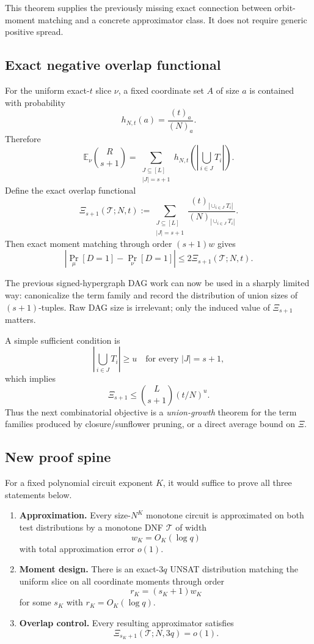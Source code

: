 \documentclass[11pt]{article}
\begin{document}
This theorem supplies the previously missing exact connection between orbit-moment matching and a concrete approximator class. It does not require generic positive spread.

\subsection{Exact negative overlap functional}
For the uniform exact-$t$ slice $\nu$, a fixed coordinate set $A$ of size $a$ is contained with probability
\[
h_{N,t}(a)=\frac{(t)_a}{(N)_a}.
\]
Therefore
\[
\mathbb E_\nu\binom R{s+1}
=
\sum_{\substack{J\subseteq[L]\\|J|=s+1}}
h_{N,t}\!\left(\left|\bigcup_{i\in J}T_i\right|\right).
\]
Define the exact overlap functional
\[
\Xi_{s+1}(\mathcal T;N,t)
:=
\sum_{\substack{J\subseteq[L]\\|J|=s+1}}
\frac{(t)_{|\cup_{i\in J}T_i|}}{(N)_{|\cup_{i\in J}T_i|}}.
\]
Then exact moment matching through order $(s+1)w$ gives
\[
\boxed{
\left|\Pr_\mu[D=1]-\Pr_\nu[D=1]\right|
\le 2\Xi_{s+1}(\mathcal T;N,t).
}
\]

The previous signed-hypergraph DAG work can now be used in a sharply limited way: canonicalize the term family and record the distribution of union sizes of $(s+1)$-tuples. Raw DAG size is irrelevant; only the induced value of $\Xi_{s+1}$ matters.

A simple sufficient condition is
\[
\left|\bigcup_{i\in J}T_i\right|\ge u
\quad\text{for every }|J|=s+1,
\]
which implies
\[
\Xi_{s+1}\le \binom L{s+1}(t/N)^u.
\]
Thus the next combinatorial objective is a \emph{union-growth} theorem for the term families produced by closure/sunflower pruning, or a direct average bound on $\Xi$.

\subsection{New proof spine}
For a fixed polynomial circuit exponent $K$, it would suffice to prove all three statements below.

\begin{enumerate}
\item \textbf{Approximation.} Every size-$N^K$ monotone circuit is approximated on both test distributions by a monotone DNF $\mathcal T$ of width
\[
w_K=O_K(\log q)
\]
with total approximation error $o(1)$.
\item \textbf{Moment design.} There is an exact-$3q$ UNSAT distribution matching the uniform slice on all coordinate moments through order
\[
r_K=(s_K+1)w_K
\]
for some $s_K$ with $r_K=O_K(\log q)$.
\item \textbf{Overlap control.} Every resulting approximator satisfies
\[
\Xi_{s_K+1}(\mathcal T;N,3q)=o(1).
\]
\end{enumerate}
\end{document}
